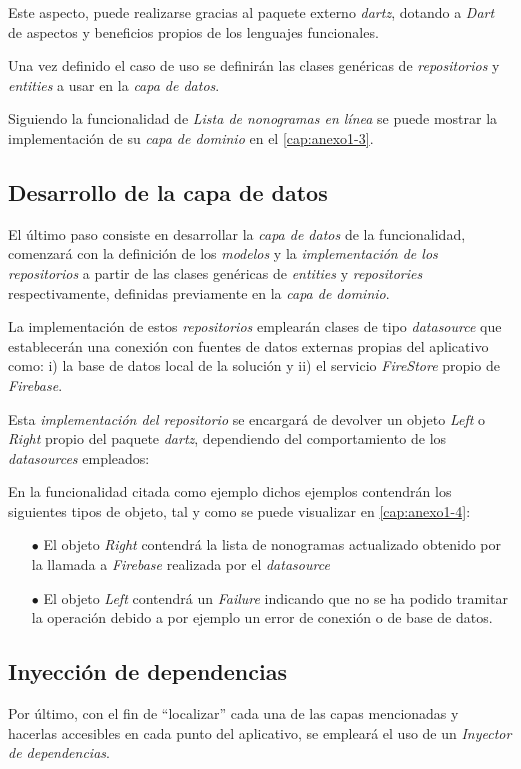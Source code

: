 Este aspecto, puede realizarse gracias al paquete externo \textit{dartz}, dotando a \textit{Dart} de aspectos y 
beneficios propios de los lenguajes funcionales.

Una vez definido el caso de uso se definirán las clases genéricas de \textit{repositorios} y \textit{entities} a usar en la
\textit{capa de datos}.

Siguiendo la funcionalidad de \textit{Lista de nonogramas en línea} se puede mostrar la implementación de su \textit{capa 
de dominio} en el \autoref{cap:anexo1-3}.

\subsection{Desarrollo de la capa de datos}
El último paso consiste en desarrollar la \textit{capa de datos} de la funcionalidad, comenzará con la definición de los
\textit{modelos} y la \textit{implementación de los repositorios} a partir de las clases genéricas de \textit{entities} y
\textit{repositories} respectivamente, definidas previamente en la \textit{capa de dominio}.

La implementación de estos \textit{repositorios} emplearán clases de tipo \textit{datasource} que establecerán una conexión
con fuentes de datos externas propias del aplicativo como: i) la base de datos local de la solución y ii) el 
servicio \textit{FireStore} propio de \textit{Firebase}.

Esta \textit{implementación del repositorio} se encargará de
devolver un objeto \textit{Left} o \textit{Right} propio del paquete \textit{dartz}, dependiendo del comportamiento de 
los \textit{datasources} empleados: 

En la funcionalidad citada como ejemplo dichos ejemplos contendrán los siguientes tipos de objeto, tal y como se puede visualizar
en \autoref{cap:anexo1-4}:
\begin{itemize}
  \item[$\bullet$] El objeto \textit{Right} contendrá la lista de nonogramas actualizado obtenido por la llamada a \textit{Firebase} realizada por el 
  \textit{datasource}
  \item[$\bullet$] El objeto \textit{Left} contendrá un \textit{Failure} indicando que no se ha podido tramitar la operación 
  debido a por ejemplo un error de conexión o de base de datos.
\end{itemize}

\subsection{Inyección de dependencias}
Por último, con el fin de ``localizar'' cada una de las capas mencionadas y hacerlas accesibles en cada punto del aplicativo,
se empleará el uso de un \textit{Inyector de dependencias}. 

